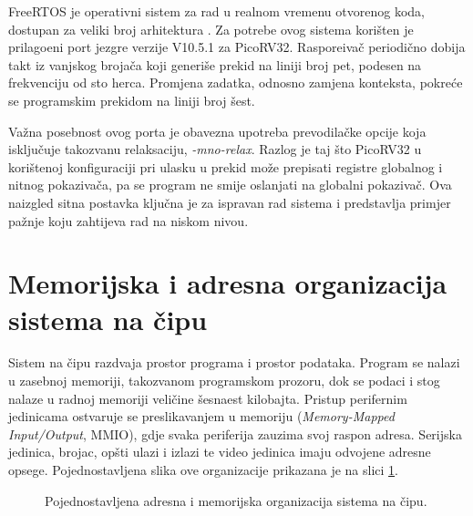 FreeRTOS je operativni sistem za rad u realnom vremenu otvorenog koda, dostupan
za veliki broj arhitektura \citep{freertos}. Za potrebe ovog sistema kori\v{s}ten
je prilago\dj{}eni port jezgre verzije V10.5.1 za PicoRV32. Raspore\dj{}iva\v{c}
periodi\v{c}no dobija takt iz vanjskog broja\v{c}a koji generi\v{s}e prekid na
liniji broj pet, podesen na frekvenciju od sto herca. Promjena zadatka, odnosno
zamjena konteksta, pokre\'ce se programskim prekidom na liniji broj \v{s}est.

Va\v{z}na posebnost ovog porta je obavezna upotreba prevodila\v{c}ke opcije koja
isklju\v{c}uje takozvanu relaksaciju, \foreignlanguage{english}{\emph{-mno-relax}}.
Razlog je taj \v{s}to PicoRV32 u kori\v{s}tenoj konfiguraciji pri ulasku u prekid
mo\v{z}e prepisati registre globalnog i nitnog pokaziva\v{c}a, pa se program ne
smije oslanjati na globalni pokaziva\v{c}. Ova naizgled sitna postavka klju\v{c}na
je za ispravan rad sistema i predstavlja primjer pa\v{z}nje koju zahtijeva rad
na niskom nivou.

\section{Memorijska i adresna organizacija sistema na \v{c}ipu}
\label{sec:platforma-memorija}

Sistem na \v{c}ipu razdvaja prostor programa i prostor podataka. Program se
nalazi u zasebnoj memoriji, takozvanom programskom prozoru, dok se podaci i stog
nalaze u radnoj memoriji veli\v{c}ine \v{s}esnaest kilobajta. Pristup
perifernim jedinicama ostvaruje se preslikavanjem u memoriju
(\foreignlanguage{english}{\emph{Memory-Mapped Input/Output}}, MMIO), gdje svaka
periferija zauzima svoj raspon adresa. Serijska jedinica, brojac, op\v{s}ti
ulazi i izlazi te video jedinica imaju odvojene adresne opsege. Pojednostavljena
slika ove organizacije prikazana je na slici \ref{fig:memorija}.

\begin{figure}[H]
\centering
{}
\caption{Pojednostavljena adresna i memorijska organizacija sistema na \v{c}ipu.}
\label{fig:memorija}
\end{figure}

